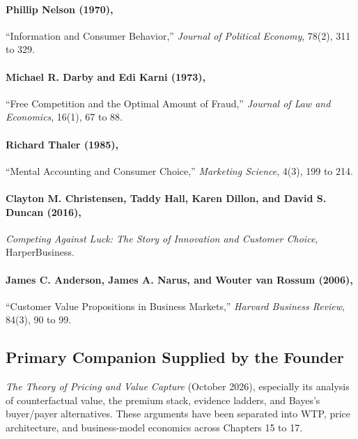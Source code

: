\paragraph*{Phillip Nelson (1970),} ``Information and Consumer Behavior,'' \emph{Journal of Political Economy}, 78(2), 311 to 329.

\paragraph*{Michael R. Darby and Edi Karni (1973),} ``Free Competition and the Optimal Amount of Fraud,'' \emph{Journal of Law and Economics}, 16(1), 67 to 88.

\paragraph*{Richard Thaler (1985),} ``Mental Accounting and Consumer Choice,'' \emph{Marketing Science}, 4(3), 199 to 214.

\paragraph*{Clayton M. Christensen, Taddy Hall, Karen Dillon, and David S. Duncan (2016),} \emph{Competing Against Luck: The Story of Innovation and Customer Choice}, HarperBusiness.

\paragraph*{James C. Anderson, James A. Narus, and Wouter van Rossum (2006),} ``Customer Value Propositions in Business Markets,'' \emph{Harvard Business Review}, 84(3), 90 to 99.

\subsection*{Primary Companion Supplied by the Founder}

\emph{The Theory of Pricing and Value Capture} (October 2026), especially its analysis of counterfactual value, the premium stack, evidence ladders, and Bayes's buyer/payer alternatives. These arguments have been separated into WTP, price architecture, and business-model economics across Chapters 15 to 17.
